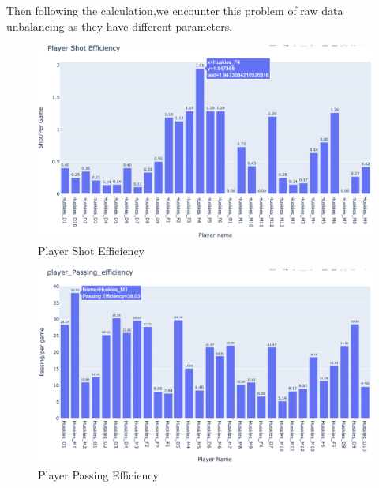 \documentclass[12pt]{article}
\begin{document}
\newline
\newline
Then following the calculation,we encounter this problem of raw data unbalancing as they have different parameters.\newline
\begin{figure}[h]
\begin{center}
\includegraphics[scale=0.5]{images/4.png}
\caption{Player Shot Efficiency}
\end{center}
\end{figure}
\begin{figure}[h]
\begin{center}
\includegraphics[scale=0.5]{images/5.png}
\caption{Player Passing Efficiency}
\end{center}
\end{figure}\newline
\newline
\newline
\newline
\newline
\newline
\end{document}
